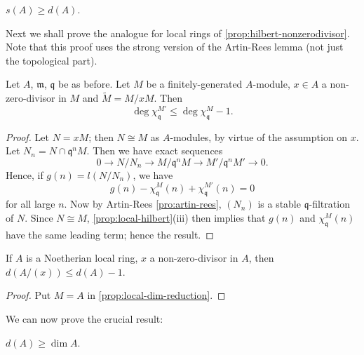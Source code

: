 \begin{proposition}\label{prop:s-geq-d}
$s(A) \geq d(A)$.
\end{proposition}

Next we shall prove the analogue for local rings of \eqref{prop:hilbert-nonzerodivisor}. Note that this proof uses the strong version of the Artin-Rees lemma (not just the topological part).

\begin{proposition}\label{prop:local-dim-reduction}
Let $A$, $\mathfrak{m}$, $\mathfrak{q}$ be as before. Let $M$ be a finitely-generated $A$-module, $x \in A$ a non-zero-divisor in $M$ and $\tilde{M} = M/xM$. Then
\[
    \deg \chi_{\mathfrak{q}}^{M'} \leq \deg \chi_{\mathfrak{q}}^M - 1.
\]
\end{proposition}

\begin{proof}
Let $N = xM$; then $N \cong M$ as $A$-modules, by virtue of the assumption on $x$. Let $N_n = N \cap \mathfrak{q}^n M$. Then we have exact sequences
\[
    0 \longrightarrow N/N_n \longrightarrow M/\mathfrak{q}^n M \longrightarrow M'/\mathfrak{q}^n M' \longrightarrow 0.
\]
Hence, if $g(n) = l(N/N_n)$, we have
\[
    g(n) - \chi_{\mathfrak{q}}^M(n) + \chi_{\mathfrak{q}}^{M'}(n) = 0
\]
for all large $n$. Now by Artin-Rees \eqref{pro:artin-rees}, $(N_n)$ is a stable $\mathfrak{q}$-filtration of $N$. Since $N \cong M$, \eqref{prop:local-hilbert}(iii) then implies that $g(n)$ and $\chi_{\mathfrak{q}}^M(n)$ have the same leading term; hence the result.
\end{proof}

\begin{corollary}\label{cor:d-quotient}
If $A$ is a Noetherian local ring, $x$ a non-zero-divisor in $A$, then $d(A/(x)) \leq d(A) - 1$.
\end{corollary}

\begin{proof}
Put $M = A$ in \eqref{prop:local-dim-reduction}.
\end{proof}

We can now prove the crucial result:

\begin{proposition}\label{prop:d-leq-dim}
$d(A) \geq \dim A$.
\end{proposition}

